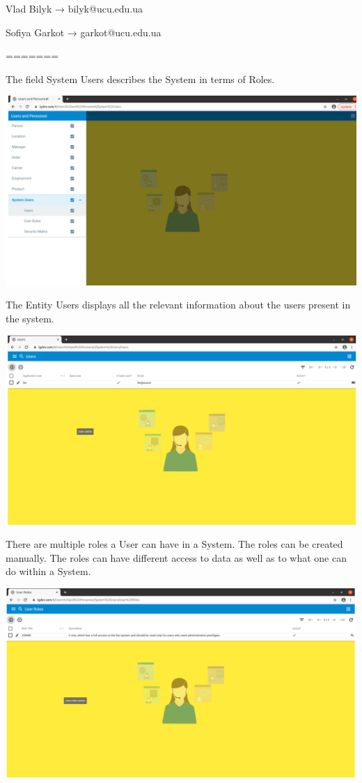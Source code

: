 Vlad Bilyk  →  bilyk@ucu.edu.ua

Sofiya Garkot  →  garkot@ucu.edu.ua

=======

The field System Users describes the System in terms of Roles. 

\includegraphics[width=\textwidth]{sections/01-chapter/images/system1.png}

The Entity Users displays all the relevant information about the users present in the system.

\includegraphics[width=\textwidth]{sections/01-chapter/images/system2.png}

There are multiple roles a User can have in a System. The roles can be created manually. The roles can have different access to data as well as to what one can do within a System.

\includegraphics[width=\textwidth]{sections/01-chapter/images/system3.png}

